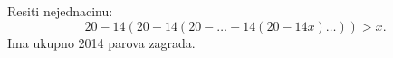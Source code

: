 \problem
Resiti nejednacinu:
\[
    20 - 14 (20 - 14 (20 - \ldots - 14 (20 - 14x) \ldots )) > x
.\]
Ima ukupno 2014 parova zagrada.
\solution
\endproblem
